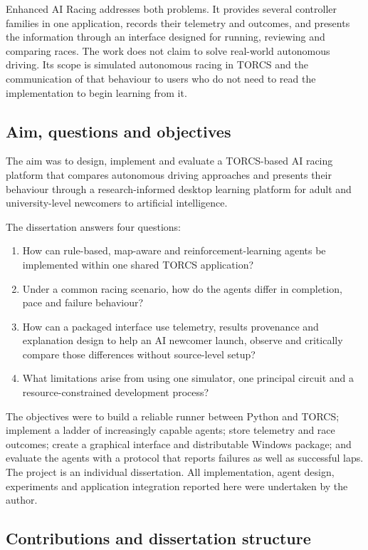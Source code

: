 Enhanced AI Racing addresses both problems. It provides several controller families in one application, records their telemetry and outcomes, and presents the information through an interface designed for running, reviewing and comparing races. The work does not claim to solve real-world autonomous driving. Its scope is simulated autonomous racing in TORCS and the communication of that behaviour to users who do not need to read the implementation to begin learning from it.

\subsection{Aim, questions and objectives}

The aim was to design, implement and evaluate a TORCS-based AI racing platform that compares autonomous driving approaches and presents their behaviour through a research-informed desktop learning platform for adult and university-level newcomers to artificial intelligence.

The dissertation answers four questions:
\begin{enumerate}[label=\arabic*.]
  \item How can rule-based, map-aware and reinforcement-learning agents be implemented within one shared TORCS application?
  \item Under a common racing scenario, how do the agents differ in completion, pace and failure behaviour?
  \item How can a packaged interface use telemetry, results provenance and explanation design to help an AI newcomer launch, observe and critically compare those differences without source-level setup?
  \item What limitations arise from using one simulator, one principal circuit and a resource-constrained development process?
\end{enumerate}

The objectives were to build a reliable runner between Python and TORCS; implement a ladder of increasingly capable agents; store telemetry and race outcomes; create a graphical interface and distributable Windows package; and evaluate the agents with a protocol that reports failures as well as successful laps. The project is an individual dissertation. All implementation, agent design, experiments and application integration reported here were undertaken by the author.

\subsection{Contributions and dissertation structure}

